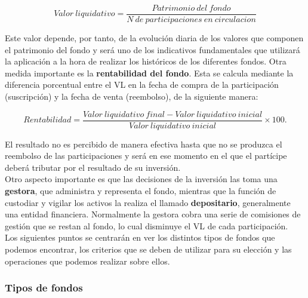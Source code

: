 \documentclass[12pt, a4paper]{article}
\begin{document}
\begin{center}
	\begin{equation}
	Valor\ liquidativo = \frac{ Patrimonio\ del\ fondo}{N\ de\ participaciones\ en\ circulacion}
	\end{equation}
	\label{valorliquidativo}
\end{center}
\vspace{1cm}

Este valor depende, por tanto, de la evolución diaria de los valores que componen el patrimonio del fondo y será uno de los indicativos fundamentales que utilizará la aplicación a la hora de realizar los históricos de los diferentes fondos. Otra medida importante es la \textbf{rentabilidad del fondo}. Esta se calcula mediante la diferencia porcentual entre el \gls{VL} en la fecha de compra de la participación (suscripción) y la fecha de venta (reembolso), de la siguiente manera:

\begin{center}
	\begin{equation}
	Rentabilidad = \frac{ Valor\ liquidativo\ final - Valor\ liquidativo\ inicial}{Valor\ liquidativo\ inicial } \times 100.
	\end{equation}
\end{center}

\newpage

El resultado no es percibido de manera efectiva hasta que no se produzca el reembolso de las participaciones y será en ese momento en el que el partícipe deberá tributar por el resultado de su inversión. \\


Otro aspecto importante es que las decisiones de la inversión las toma una \textbf{gestora}, que administra y representa el fondo, mientras que la función de custodiar y vigilar los activos la realiza el llamado \textbf{depositario}, generalmente una entidad financiera. Normalmente la gestora cobra una serie de comisiones de gestión que se restan al fondo, lo cual disminuye el \gls{VL} de cada participación.\\

Los siguientes puntos se centrarán en ver los distintos tipos de fondos que podemos encontrar, los criterios que se deben de utilizar para su elección y las operaciones que podemos realizar sobre ellos.


\subsubsection{Tipos de fondos }
\end{document}
